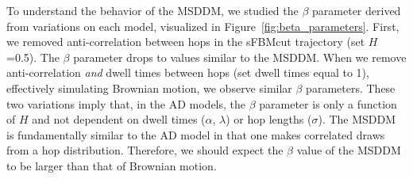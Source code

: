 \documentclass[12pt]{article}
\begin{document}
  To understand the behavior of the MSDDM, we studied the $\beta$ parameter derived 
  from variations on each model, visualized in Figure~\ref{fig:beta_parameters}. First, 
  we removed anti-correlation between hops in the sFBMcut trajectory (set $H$=0.5). 
  The $\beta$ parameter drops to values similar to the MSDDM. When we remove anti-correlation
  \textit{and} dwell times between hops (set dwell times equal to 1), effectively simulating 
  Brownian motion, we observe similar $\beta$ parameters. These two variations imply that,
  in the AD models, the $\beta$ parameter is only a function of $H$ and not dependent on
  dwell times ($\alpha$, $\lambda$) or hop lengths ($\sigma$). The MSDDM is fundamentally similar to 
  the AD model in that one makes correlated draws from a hop distribution. Therefore,
  we should expect the $\beta$ value of the MSDDM to be larger than that of Brownian 
  motion.
  
\end{document}

